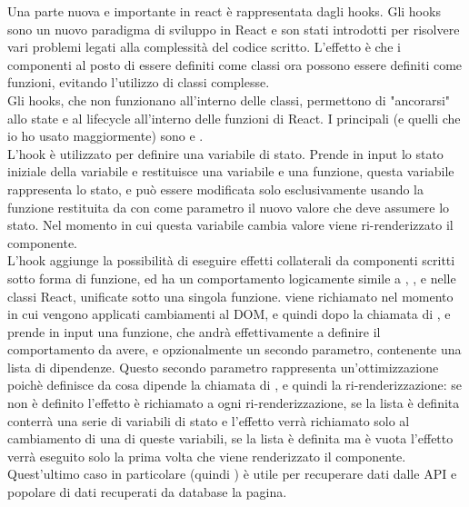 \noindent
Una parte nuova e importante in react è rappresentata dagli hooks. Gli hooks sono un nuovo paradigma di sviluppo in React e son stati introdotti per risolvere vari problemi legati alla complessità del codice scritto. L'effetto è che i componenti al posto di essere definiti come classi ora possono essere definiti come funzioni, evitando l'utilizzo di classi complesse.\\
Gli hooks, che non funzionano all'interno delle classi, permettono di "ancorarsi" allo state e al lifecycle all'interno delle funzioni di React. I principali (e quelli che io ho usato maggiormente) sono  e . \\
L'hook  è utilizzato per definire una variabile di stato. Prende in input lo stato iniziale della variabile e restituisce una variabile e una funzione, questa variabile rappresenta lo stato, e può essere modificata solo esclusivamente usando la funzione restituita da  con come parametro il nuovo valore che deve assumere lo stato. Nel momento in cui questa variabile cambia valore viene ri-renderizzato il componente.\\
L'hook  aggiunge la possibilità di eseguire effetti collaterali da componenti scritti sotto forma di funzione, ed ha un comportamento logicamente simile a , , e  nelle classi React, unificate sotto una singola funzione.  viene richiamato nel momento in cui vengono applicati cambiamenti al DOM, e quindi dopo la chiamata di , e prende in input una funzione, che andrà effettivamente a definire il comportamento da avere, e opzionalmente un secondo parametro, contenente una lista di dipendenze. Questo secondo parametro rappresenta un'ottimizzazione poichè definisce da cosa dipende la chiamata di , e quindi la ri-renderizzazione: se non è definito l'effetto è richiamato a ogni ri-renderizzazione, se la lista è definita conterrà una serie di variabili di stato e l'effetto verrà richiamato solo al cambiamento di una di queste variabili, se la lista è definita ma è vuota l'effetto verrà eseguito solo la prima volta che viene renderizzato il componente. Quest'ultimo caso in particolare (quindi ) è utile per recuperare dati dalle API e popolare di dati recuperati da database la pagina.



